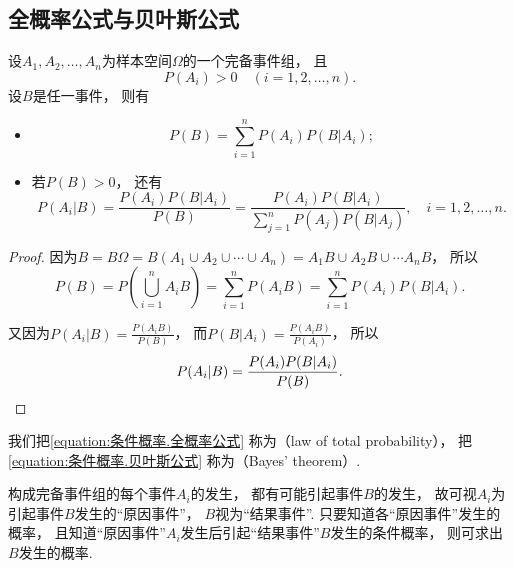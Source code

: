 \subsection{全概率公式与贝叶斯公式}
\begin{theorem}
设\(A_1,A_2,\dotsc,A_n\)为样本空间\(\Omega\)的一个完备事件组，
且\begin{equation*}
	P(A_i) > 0 \quad(i=1,2,\dotsc,n).
\end{equation*}
设\(B\)是任一事件，
则有\begin{itemize}
	\item
	\begin{equation}\label{equation:条件概率.全概率公式}
		P(B) = \sum_{i=1}^n P(A_i) P(B \vert A_i);
	\end{equation}

	\item
	若\(P(B) > 0\)，
	还有\begin{equation}\label{equation:条件概率.贝叶斯公式}
		P(A_i \vert B) = \frac{P(A_i) P(B \vert A_i)}{P(B)}
		= \frac{P(A_i) P(B \vert A_i)}{\sum_{j=1}^n P(A_j) P(B \vert A_j)},
		\quad i = 1,2,\dotsc,n.
	\end{equation}
\end{itemize}
\begin{proof}
因为\(B = B \Omega
= B(A_1 \cup A_2 \cup \dotsb \cup A_n)
= A_1 B \cup A_2 B \cup \dotsb A_n B\)，
所以\begin{equation*}
	P(B) = P\left(\bigcup_{i=1}^n A_i B\right)
	= \sum_{i=1}^n P(A_i B)
	= \sum_{i=1}^n P(A_i) P(B \vert A_i).
\end{equation*}

又因为\(P(A_i \vert B)
= \frac{P(A_i B)}{P(B)}\)，
而\(P(B \vert A_i)
= \frac{P(A_i B)}{P(A_i)}\)，
所以\begin{equation*}
	P(A_i \vert B) = \frac{P(A_i) P(B \vert A_i)}{P(B)}.
	\qedhere
\end{equation*}
\end{proof}
\end{theorem}

我们把\cref{equation:条件概率.全概率公式}
称为（law of total probability），
把\cref{equation:条件概率.贝叶斯公式}
称为（Bayes' theorem）.

构成完备事件组的每个事件\(A_i\)的发生，
都有可能引起事件\(B\)的发生，
故可视\(A_i\)为引起事件\(B\)发生的“原因事件”，
\(B\)视为“结果事件”.
只要知道各“原因事件”发生的概率，
且知道“原因事件”\(A_i\)发生后引起“结果事件”\(B\)发生的条件概率，
则可求出\(B\)发生的概率.

